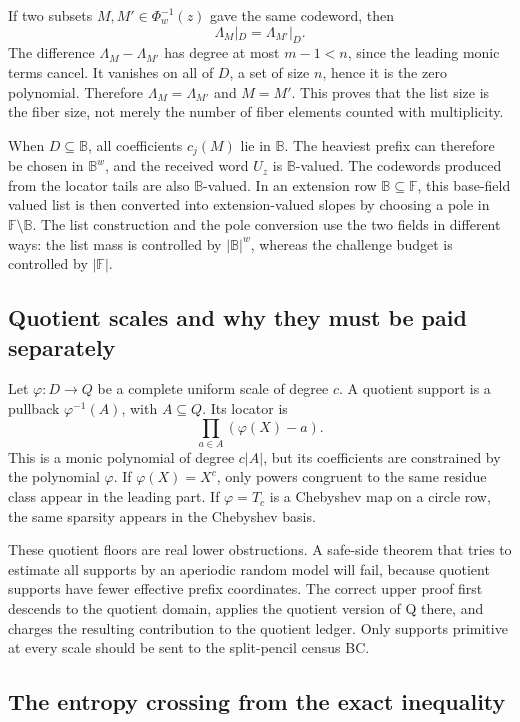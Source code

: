 \documentclass[11pt]{article}
\theoremstyle{definition}
\theoremstyle{remark}
\newcommand{\F}{\mathbb F}
\newcommand{\BB}{\mathbb B}
\begin{document}
If two subsets \(M,M'\in\Phi_w^{-1}(z)\) gave the same codeword, then
\[
        \Lambda_M|_D=\Lambda_{M'}|_D .
\]
The difference \(\Lambda_M-\Lambda_{M'}\) has degree at most \(m-1<n\), since the leading monic terms cancel.  It vanishes on all of \(D\), a set of size \(n\), hence it is the zero polynomial.  Therefore \(\Lambda_M=\Lambda_{M'}\) and \(M=M'\).  This proves that the list size is the fiber size, not merely the number of fiber elements counted with multiplicity.

When \(D\subseteq\BB\), all coefficients \(c_j(M)\) lie in \(\BB\).  The heaviest prefix can therefore be chosen in \(\BB^w\), and the received word \(U_z\) is \(\BB\)-valued.  The codewords produced from the locator tails are also \(\BB\)-valued.  In an extension row \(\BB\subseteq\F\), this base-field valued list is then converted into extension-valued slopes by choosing a pole in \(\F\setminus\BB\).  The list construction and the pole conversion use the two fields in different ways: the list mass is controlled by \(|\BB|^w\), whereas the challenge budget is controlled by \(|\F|\).

\subsection{Quotient scales and why they must be paid separately}\label{appsub:quotient-paid}

Let \(\varphi:D\to Q\) be a complete uniform scale of degree \(c\).  A quotient support is a pullback \(\varphi^{-1}(A)\), with \(A\subseteq Q\).  Its locator is
\[
        \prod_{a\in A}(\varphi(X)-a).
\]
This is a monic polynomial of degree \(c|A|\), but its coefficients are constrained by the polynomial \(\varphi\).  If \(\varphi(X)=X^c\), only powers congruent to the same residue class appear in the leading part.  If \(\varphi=T_c\) is a Chebyshev map on a circle row, the same sparsity appears in the Chebyshev basis.

These quotient floors are real lower obstructions.  A safe-side theorem that tries to estimate all supports by an aperiodic random model will fail, because quotient supports have fewer effective prefix coordinates.  The correct upper proof first descends to the quotient domain, applies the quotient version of Q there, and charges the resulting contribution to the quotient ledger.  Only supports primitive at every scale should be sent to the split-pencil census BC.

\subsection{The entropy crossing from the exact inequality}\label{appsub:entropy-crossing}
\end{document}

